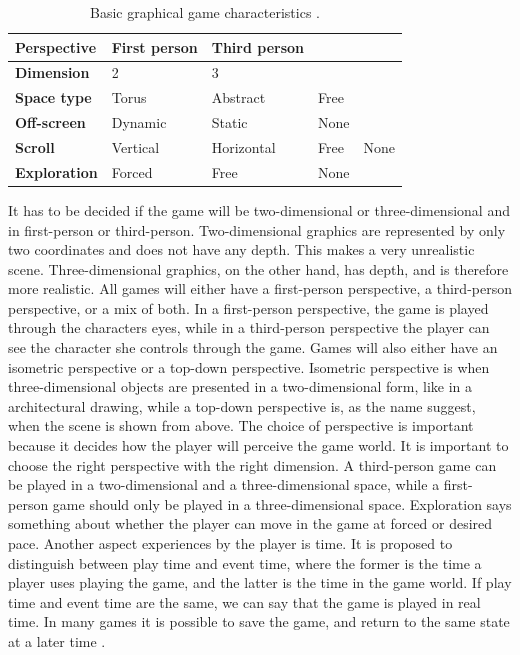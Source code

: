 \begin{table}
\centering
    \begin{tabular}{|l|l|l|l|l|}
        \hline
       \textbf{Perspective} & First person & Third person & &  \\ \hline
       \textbf{Dimension} & 2 & 3 & & \\ \hline
       \textbf{Space type} & Torus & Abstract & Free & \\ \hline
	   \textbf{Off-screen} & Dynamic & Static & None & \\ \hline
	   \textbf{Scroll} & Vertical & Horizontal & Free & None \\ \hline
	   \textbf{Exploration} & Forced & Free & None & \\
        \hline
    \end{tabular}
    \caption[Graphical Characteristics]{Basic graphical game characteristics \cite{understandingvg}.}
    \label{tab:graphic}
\end{table} 

It has to be decided if the game will be two-dimensional or three-dimensional and in first-person or third-person. Two-dimensional graphics are represented by only two coordinates and does not have any depth. This makes a very unrealistic scene. Three-dimensional graphics, on the other hand, has depth, and is therefore more realistic. All games will either have a first-person perspective, a third-person perspective, or a mix of both. In a first-person perspective, the game is played through the characters eyes, while in a third-person perspective the player can see the character she controls through the game. Games will also either have an isometric perspective or a top-down perspective. Isometric perspective is when three-dimensional objects are presented in a two-dimensional form, like in a architectural drawing, while a top-down perspective is, as the name suggest, when the scene is shown from above. The choice of perspective is important because it decides how the player will perceive the game world. It is important to choose the right perspective with the right dimension. A third-person game can be played in a two-dimensional and a three-dimensional space, while a first-person game should only be played in a three-dimensional space. Exploration says something about whether the player can move in the game at forced or desired pace. Another aspect experiences by the player is time. It is proposed to distinguish between play time and event time, where the former is the time a player uses playing the game, and the latter is the time in the game world. If play time and event time are the same, we can say that the game is played in real time. In many games it is possible to save the game, and return to the same state at a later time \cite{understandingvg}.


